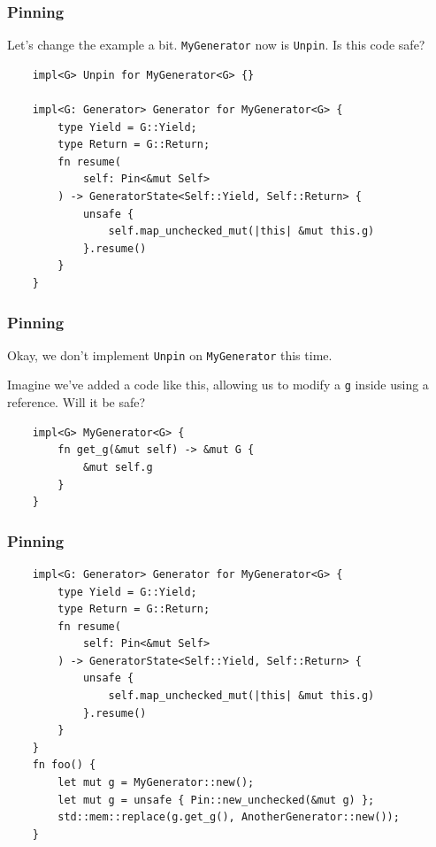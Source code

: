\documentclass[aspectratio=1610,t]{beamer}
\begin{document}

\begin{frame}[fragile]
\frametitle{Pinning}
Let's change the example a bit. \texttt{MyGenerator} now is \texttt{Unpin}. Is this code safe?

\begin{verbatim}
    impl<G> Unpin for MyGenerator<G> {}

    impl<G: Generator> Generator for MyGenerator<G> {
        type Yield = G::Yield;
        type Return = G::Return;
        fn resume(
            self: Pin<&mut Self>
        ) -> GeneratorState<Self::Yield, Self::Return> {
            unsafe {
                self.map_unchecked_mut(|this| &mut this.g)
            }.resume()
        }
    }
\end{verbatim}
\end{frame}


\begin{frame}[fragile]
\frametitle{Pinning}
Okay, we don't implement \texttt{Unpin} on \texttt{MyGenerator} this time.

Imagine we've added a code like this, allowing us to modify a \texttt{g} inside using a reference. Will it be safe?

\begin{verbatim}
    impl<G> MyGenerator<G> {
        fn get_g(&mut self) -> &mut G {
            &mut self.g
        }
    }
\end{verbatim}
\end{frame}


\begin{frame}[fragile]
\frametitle{Pinning}
\begin{verbatim}
    impl<G: Generator> Generator for MyGenerator<G> {
        type Yield = G::Yield;
        type Return = G::Return;
        fn resume(
            self: Pin<&mut Self>
        ) -> GeneratorState<Self::Yield, Self::Return> {
            unsafe {
                self.map_unchecked_mut(|this| &mut this.g)
            }.resume()
        }
    }
    fn foo() {
        let mut g = MyGenerator::new();
        let mut g = unsafe { Pin::new_unchecked(&mut g) };
        std::mem::replace(g.get_g(), AnotherGenerator::new());
    }
\end{verbatim}
\end{frame}
\end{document}
